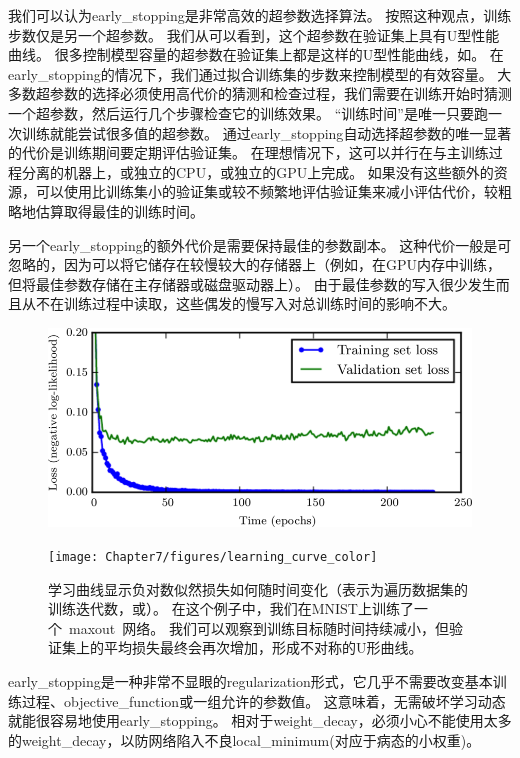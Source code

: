 我们可以认为\gls{early_stopping}是非常高效的超参数选择算法。
按照这种观点，训练步数仅是另一个超参数。
我们从可以看到，这个超参数在验证集上具有U型性能曲线。
很多控制模型容量的超参数在验证集上都是这样的U型性能曲线，如。
在\gls{early_stopping}的情况下，我们通过拟合训练集的步数来控制模型的有效容量。
大多数超参数的选择必须使用高代价的猜测和检查过程，我们需要在训练开始时猜测一个超参数，然后运行几个步骤检查它的训练效果。
``训练时间''是唯一只要跑一次训练就能尝试很多值的超参数。
通过\gls{early_stopping}自动选择超参数的唯一显著的代价是训练期间要定期评估验证集。
在理想情况下，这可以并行在与主训练过程分离的机器上，或独立的CPU，或独立的GPU上完成。
如果没有这些额外的资源，可以使用比训练集小的验证集或较不频繁地评估验证集来减小评估代价，较粗略地估算取得最佳的训练时间。

另一个\gls{early_stopping}的额外代价是需要保持最佳的参数副本。
这种代价一般是可忽略的，因为可以将它储存在较慢较大的存储器上（例如，在GPU内存中训练，但将最佳参数存储在主存储器或磁盘驱动器上）。
由于最佳参数的写入很少发生而且从不在训练过程中读取，这些偶发的慢写入对总训练时间的影响不大。

\begin{figure}[!htb]
\ifOpenSource
\centerline{\includegraphics[scale=0.5]{images/56.png}}
\else
\centerline{\texttt{[image: Chapter7/figures/learning\_curve\_color]}}
\fi
\caption{学习曲线显示负对数似然损失如何随时间变化（表示为遍历数据集的训练迭代数，或）。
在这个例子中，我们在MNIST上训练了一个~\gls{maxout}~网络。
我们可以观察到训练目标随时间持续减小，但验证集上的平均损失最终会再次增加，形成不对称的U形曲线。
}
\label{fig:chap7_learning_curve}
\end{figure}


\gls{early_stopping}是一种非常不显眼的\gls{regularization}形式，它几乎不需要改变基本训练过程、\gls{objective_function}或一组允许的参数值。
这意味着，无需破坏学习动态就能很容易地使用\gls{early_stopping}。
相对于\gls{weight_decay}，必须小心不能使用太多的\gls{weight_decay}，以防网络陷入不良\gls{local_minimum}(对应于病态的小权重)。

